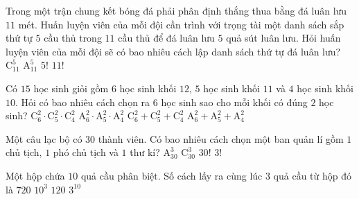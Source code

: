 \begin{ex}%
	Trong một trận chung kết bóng đá phải phân định thắng thua bằng đá luân lưu $11$ mét. Huấn luyện viên của mỗi đội cần trình với trọng tài một danh sách sắp thứ tự $5$ cầu thủ trong $11$ cầu thủ để đá luân lưu $5$ quả sút luân lưu. Hỏi huấn luyện viên của mỗi đội sẽ có bao nhiêu cách lập danh sách thứ tự đá luân lưu?
	\choice
	{$\mathrm{C}^5_{11}$}
	{\True $\mathrm{A}^5_{11}$}
	{$5!$}
	{$11!$}
\end{ex}
\begin{ex}%
	Có $15$ học sinh giỏi gồm $6$ học sinh khối $12$, $5$ học sinh khối $11$ và $4$ học sinh khối $10$. Hỏi có bao nhiêu cách chọn ra $6$ học sinh sao cho mỗi khối có đúng $2$ học sinh? 
	\choice
	{\True $\mathrm{C}^2_6\cdot \mathrm{C}^2_5\cdot \mathrm{C}^2_4$}
	{$\mathrm{A}^2_6\cdot \mathrm{A}^2_5\cdot \mathrm{A}^2_4$}
	{$\mathrm{C}^2_6+ \mathrm{C}^2_5+ \mathrm{C}^2_4$}
	{$\mathrm{A}^2_6+ \mathrm{A}^2_5+ \mathrm{A}^2_4$}
\end{ex}
\begin{ex}%
	Một câu lạc bộ có $30$ thành viên. Có bao nhiêu cách chọn một ban quản lí gồm $1$ chủ tịch, $1$ phó chủ tịch và $1$ thư kí?
	\choice
	{\True $\mathrm{A}^3_{30}$}
	{$\mathrm{C}^3_{30}$}
	{$30!$}
	{$3!$}
\end{ex}
\begin{ex}%
	Một hộp chứa $10$ quả cầu phân biệt. Số cách lấy ra cùng lúc $3$ quả cầu từ hộp đó là
	\choice
	{$720$}
	{$10^3$}
	{\True $120$}
	{$3^{10}$}
\end{ex}
